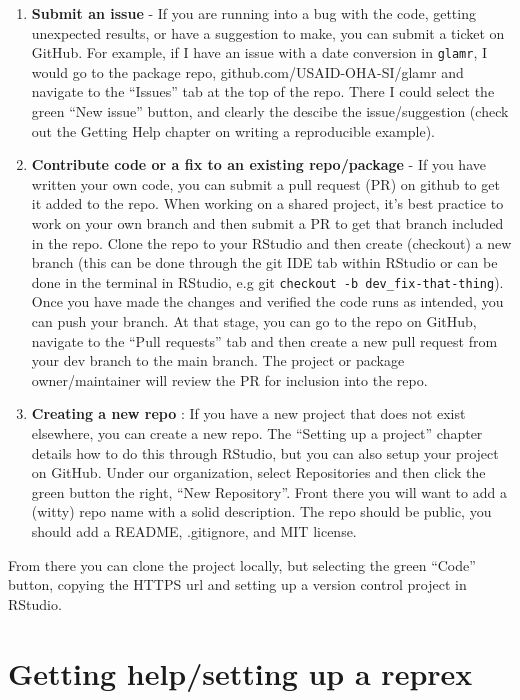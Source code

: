 \documentclass[
  letterpaper,
  DIV=11,
  numbers=noendperiod]{scrreprt}
\begin{document}
\begin{enumerate}
\def\labelenumi{\alph{enumi}.}
\item
  \textbf{Submit an issue} - If you are running into a bug with the
  code, getting unexpected results, or have a suggestion to make, you
  can submit a ticket on GitHub. For example, if I have an issue with a
  date conversion in \texttt{glamr}, I would go to the package repo,
  github.com/USAID-OHA-SI/glamr and navigate to the ``Issues'' tab at
  the top of the repo. There I could select the green ``New issue''
  button, and clearly the descibe the issue/suggestion (check out the
  Getting Help chapter on writing a reproducible example).
\item
  \textbf{Contribute code or a fix to an existing repo/package} - If you
  have written your own code, you can submit a pull request (PR) on
  github to get it added to the repo. When working on a shared project,
  it's best practice to work on your own branch and then submit a PR to
  get that branch included in the repo. Clone the repo to your RStudio
  and then create (checkout) a new branch (this can be done through the
  git IDE tab within RStudio or can be done in the terminal in RStudio,
  e.g git \texttt{checkout\ -b\ dev\_fix-that-thing}). Once you have
  made the changes and verified the code runs as intended, you can push
  your branch. At that stage, you can go to the repo on GitHub, navigate
  to the ``Pull requests'' tab and then create a new pull request from
  your dev branch to the main branch. The project or package
  owner/maintainer will review the PR for inclusion into the repo.
\item
  \textbf{Creating a new repo }: If you have a new project that does not
  exist elsewhere, you can create a new repo. The ``Setting up a
  project'' chapter details how to do this through RStudio, but you can
  also setup your project on GitHub. Under our organization, select
  Repositories and then click the green button the right, ``New
  Repository''. Front there you will want to add a (witty) repo name
  with a solid description. The repo should be public, you should add a
  README, .gitignore, and MIT license.
\end{enumerate}

From there you can clone the project locally, but selecting the green
``Code'' button, copying the HTTPS url and setting up a version control
project in RStudio.

\hypertarget{getting-helpsetting-up-a-reprex}{%
\chapter{Getting help/setting up a
reprex}\label{getting-helpsetting-up-a-reprex}}
\end{document}
